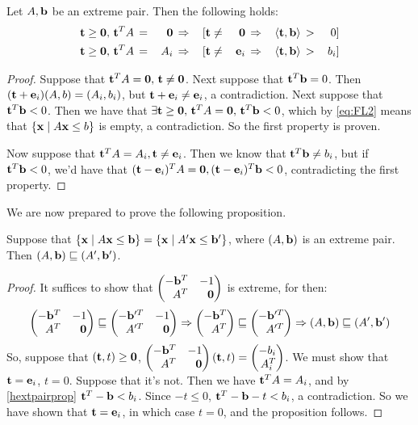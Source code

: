 \begin{Prop}{\label{prop:hextpair}
  Let $A,\mathbf{b}$ be an extreme pair.  Then the following holds:
  \begin{alignat}{6}
    \mathbf{t}\geq\mathbf{0},\,\mathbf{t}^T A \,&=&\, \mathbf{0}  \,&\Rightarrow&\, [\mathbf{t} &\neq&\, \mathbf{0} \,
          &\Rightarrow&\, \left\langle \mathbf{t}, \mathbf{b} \right\rangle \,&>&\, 0 ] \\
    \label{hextpairprop} \mathbf{t}\geq\mathbf{0},\,\mathbf{t}^T A \,&=&\, A_i \,&\Rightarrow&\, [\mathbf{t} &\neq&\, \mathbf{e}_i \,
          &\Rightarrow&\, \left\langle \mathbf{t}, \mathbf{b} \right\rangle \,&>&\, b_i ]
  \end{alignat}
}\end{Prop}
\begin{proof}
  Suppose that $\mathbf{t}^T A = \mathbf{0},\, \mathbf{t}\neq\mathbf{0}$.  Next suppose that $\mathbf{t}^T\mathbf{b} = 0$.  Then $(\mathbf{t} + \mathbf{e}_i)(A,b) = (A_i,b_i)$, but $\mathbf{t}+\mathbf{e}_i \neq \mathbf{e}_i$, a contradiction.  Next suppose that ${\mathbf{t}^T\mathbf{b} < 0}$.  Then we have that $\exists \mathbf{t}\geq\mathbf{0},\,\mathbf{t}^T A = \mathbf{0},\,\mathbf{t}^T \mathbf{b} < 0$, which by \eqref{eq:FL2} means that $\left\{\mathbf{x}\;|\; A\mathbf{x}\leq b\right\}$ is empty, a contradiction.  So the first property is proven.

  Now suppose that $\mathbf{t}^T A = A_i, \mathbf{t}\neq\mathbf{e}_i$.  Then we know that $\mathbf{t}^T \mathbf{b} \neq b_i$, but if $\mathbf{t}^T\mathbf{b} < 0$, we'd have that $(\mathbf{t} - \mathbf{e}_i)^T A = \mathbf{0}, (\mathbf{t}-\mathbf{e}_i)^T\mathbf{b} < 0$, contradicting the first property.
\end{proof}

We are now prepared to prove the following proposition.

\begin{Prop}{\label{prop:ddhext}
  Suppose that $\left\{\mathbf{x}\;|\; A\mathbf{x}\leq \mathbf{b}\right\} = \left\{\mathbf{x}\;|\; A'\mathbf{x}\leq \mathbf{b}'\right\}$, where $(A,\mathbf{b})$ is an extreme pair.  Then $(A,\mathbf{b}) \sqsubseteq (A',\mathbf{b}')$.
}\end{Prop}

\begin{proof}
It suffices to show that $\pmb -\b^T & -1 \\ A^T & \0 \pme$ is extreme, for then:
  \[\pmb -\b^T & -1 \\ A^T & \0 \pme \sqsubseteq \pmb -\b'^T & -1 \\ A'^T & \0 \pme \Rightarrow
    \pmb -\b^T \\ A^T \pme \sqsubseteq \pmb -\b'^T \\ A'^T \pme \Rightarrow
    (A,\b) \sqsubseteq (A',\b')
  \]
So, suppose that $(\mathbf{t},t) \geq \mathbf{0}$, $\pmb -\b^T & -1 \\ A^T & \0 \pme(\t,t) = \pmb -b_i \\ A^T_i\pme$.  We must show that $\mathbf{t} = \mathbf{e}_i$, $t = 0$.  Suppose that it's not.  Then we have $\mathbf{t}^T A = A_i$, and by \eqref{hextpairprop} $\mathbf{t}^T-\mathbf{b} < b_i$.  Since $-t \leq 0$, $\mathbf{t}^T-\mathbf{b} - t < b_i$, a contradiction.  So we have shown that $\mathbf{t} = \mathbf{e}_i$, in which case $t = 0$, and the proposition follows.
\end{proof}

